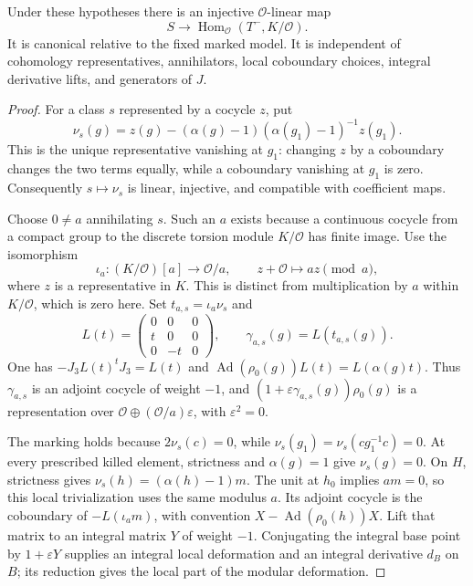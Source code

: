 \begin{theorem}\label{selmer-conormal-pairing}
Under these hypotheses there is an injective $\mathcal O$-linear map
\[
 S\longrightarrow\operatorname{Hom}_{\mathcal O}(T^-,K/\mathcal O).
\]
It is canonical relative to the fixed marked model. It is independent
of cohomology representatives, annihilators, local coboundary choices,
integral derivative lifts, and generators of $J$.
\end{theorem}
\begin{proof}
For a class $s$ represented by a cocycle $z$, put
\[
 \nu_s(g)=z(g)-(\alpha(g)-1)
                         (\alpha(g_1)-1)^{-1}z(g_1).
\]
This is the unique representative vanishing at $g_1$: changing $z$
by a coboundary changes the two terms equally, while a coboundary
vanishing at $g_1$ is zero. Consequently $s\mapsto\nu_s$ is linear,
injective, and compatible with coefficient maps.

Choose $0\ne a$ annihilating $s$. Such an $a$ exists because a
continuous cocycle from a compact group to the discrete torsion module
$K/\mathcal O$ has finite image. Use the isomorphism
\[
 \iota_a:(K/\mathcal O)[a]\longrightarrow\mathcal O/a,
 \qquad z+\mathcal O\longmapsto az\pmod a,
\]
where $z$ is a representative in $K$. This is distinct from
multiplication by $a$ within $K/\mathcal O$, which is zero here.
Set $t_{a,s}=\iota_a\nu_s$ and
\[
 L(t)=\begin{pmatrix}0&0&0\\t&0&0\\0&-t&0\end{pmatrix},
 \qquad \gamma_{a,s}(g)=L(t_{a,s}(g)).
\]
One has $-J_3L(t)^tJ_3=L(t)$ and
$\operatorname{Ad}(\rho_0(g))L(t)=L(\alpha(g)t)$.
Thus $\gamma_{a,s}$ is an adjoint cocycle of weight $-1$, and
$(1+\varepsilon\gamma_{a,s}(g))\rho_0(g)$ is a representation over
$\mathcal O\oplus(\mathcal O/a)\varepsilon$, with $\varepsilon^2=0$.

The marking holds because $2\nu_s(c)=0$, while
$\nu_s(g_1)=\nu_s(cg_1^{-1}c)=0$. At every prescribed killed
element, strictness and $\alpha(g)=1$ give $\nu_s(g)=0$.
On $H$, strictness gives $\nu_s(h)=(\alpha(h)-1)m$.
The unit at $h_0$ implies $am=0$, so this local trivialization
uses the same modulus $a$. Its adjoint cocycle is the coboundary of
$-L(\iota_a m)$, with convention
$X-\operatorname{Ad}(\rho_0(h))X$. Lift that matrix to an integral
matrix $Y$ of weight $-1$. Conjugating the integral base point by
$1+\varepsilon Y$ supplies an integral local deformation and an
integral derivative $d_B$ on $B$; its reduction gives the local
part of the modular deformation.


\end{proof}
